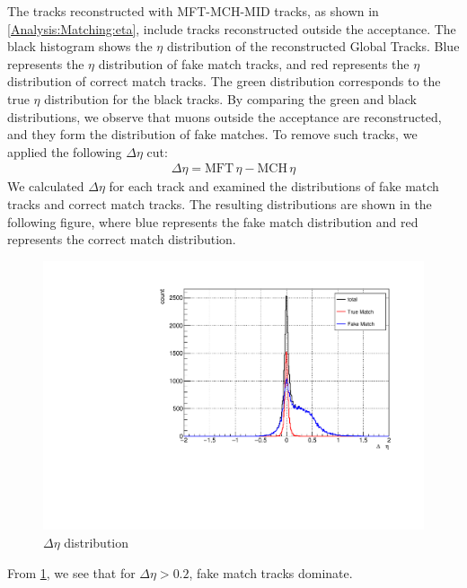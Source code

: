                 The tracks reconstructed with MFT-MCH-MID tracks, as shown in \ref{Analysis:Matching:eta}, include tracks reconstructed outside the acceptance. The black histogram shows the $\eta$ distribution of the reconstructed Global Tracks. Blue represents the $\eta$ distribution of fake match tracks, and red represents the $\eta$ distribution of correct match tracks. The green distribution corresponds to the true $\eta$ distribution for the black tracks. By comparing the green and black distributions, we observe that muons outside the acceptance are reconstructed, and they form the distribution of fake matches. 
                To remove such tracks, we applied the following $\Delta \eta$ cut:
                \begin{eqnarray}
                    \Delta \eta = \text{MFT} \, \eta - \text{MCH} \, \eta  
                \end{eqnarray}
                We calculated $\Delta \eta$ for each track and examined the distributions of fake match tracks and correct match tracks. The resulting distributions are shown in the following figure, where blue represents the fake match distribution and red represents the correct match distribution.
                \begin{figure}[H]
                    \centering
                    \includegraphics[keepaspectratio, scale=0.5]{fig/3_5_6_etacutno_deltaeta.pdf} %
                    \caption{$\Delta \eta$ distribution}
                    \label{Analysis:Matching:DeltaEta}
                \end{figure}
                From \ref{Analysis:Matching:DeltaEta}, we see that for $\Delta \eta > 0.2$, fake match tracks dominate. 
